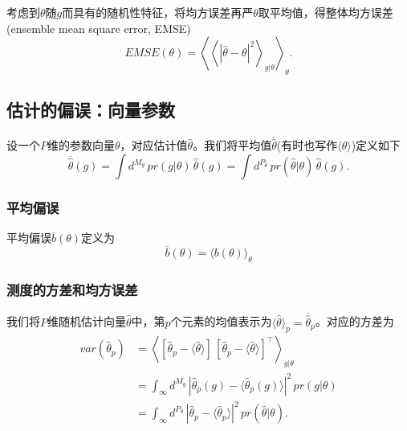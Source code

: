 考虑到$\theta$随$g$而具有的随机性特征，将均方误差再严$\theta$取平均值，得整体均方误差(ensemble mean square error, EMSE)
\begin{equation}
  \label{eq:mle-emse-def}
  EMSE(\theta) =
  \left\langle
  \left\langle
  \left| \hat{\theta} - \theta \right|^{2}
  \right\rangle_{g|\theta}
  \right\rangle_{\theta}.
\end{equation}

\subsection{估计的偏误：向量参数}
\label{sec:mle-bias-vector}
设一个$P$维的参数向量$\theta$，对应估计值$\hat{\theta}$。我们将平均值$\overline{\hat{\theta}}$(有时也写作$\langle \theta \rangle$)定义如下
\begin{equation}
  \label{eq:mle-estimate-vector}
  \overline{\hat{\theta}} \left( g \right) = \int d^{M_g} \, pr \left(g | \theta \right) \, \hat{\theta}\left ( g \right) = \int d^{P_{\hat{\theta}}} \, pr \left( \hat{\theta} | \theta \right) \, \hat{\theta}\left( g \right).
\end{equation}

\subsubsection{平均偏误}
平均偏误$\overline{b}\left( \theta \right)$定义为
\begin{equation}
  \label{eq:mle-estimate-vector-bias-avg}
  \overline{b}(\theta) =
  \langle b \left( \theta \right) \rangle_{\theta}
\end{equation}

\subsubsection{测度的方差和均方误差}
我们将$P$维随机估计向量$\hat{\theta}$中，第$p$个元素的均值表示为$\langle \hat{\theta} \rangle_{p} = \overline{\hat{\theta}}_{p}$。对应的方差为
\begin{equation}
  \begin{split}
  \label{eq:mle-esitmate-vector-variance}
  var \left( \hat{\theta}_{p} \right)
  & = \left\langle
  \left[
  \hat{\theta}_{p} - \langle \hat{\theta} \rangle
  \right] \, \left[
  \hat{\theta}_{p} - \langle \hat{\theta} \rangle
  \right]^{\top}
  \right\rangle_{g | \theta} \\
  & = \int_{\infty} d^{M_{g}} \,
  \left|
  \hat{\theta}_{p} \left( g \right) - \langle \hat{\theta}_{p} \left( g \right) \rangle
  \right|^{2} \, pr \left( g | \theta \right) \\
  & = \int_{\infty} d^{P_{\theta}} \,
  \left|
  \hat{\theta}_{p} - \langle \hat{\theta}_{p} \rangle
  \right|^{2} \,
  pr \left( \hat{\theta} | \theta \right).
\end{split}
\end{equation}

